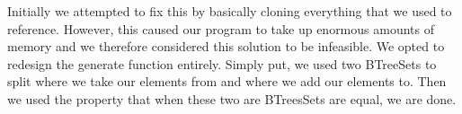 \documentclass{article}
\begin{document}
Initially we attempted to fix this by basically cloning everything that we used to reference. However, this
caused our program to take up enormous amounts of memory and we therefore considered this solution to be
infeasible. We opted to redesign the generate function entirely. Simply put, we used two BTreeSets to split
where we take our elements from and where we add our elements to. Then we used the property that when these
two are BTreesSets are equal, we are done.
\end{document}
